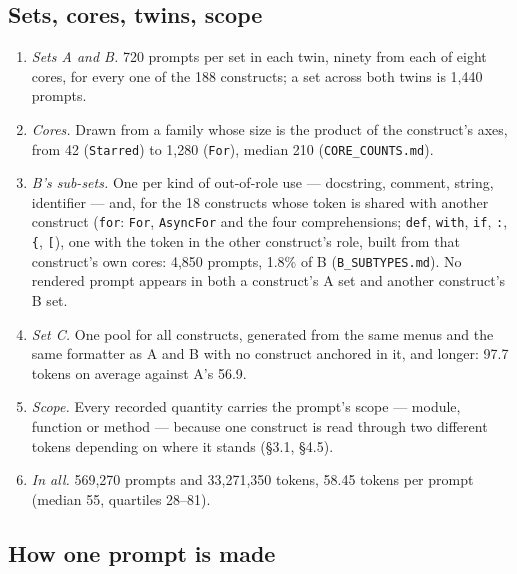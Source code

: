 \documentclass{article}
\begin{document}
\subsection{Sets, cores, twins, scope}
\begin{enumerate}[topsep=2pt,itemsep=1pt,parsep=0pt,partopsep=0pt,leftmargin=*]
\item \emph{Sets A and B.} 720 prompts per set in each twin, ninety from each of eight cores, for every one of the 188 constructs; a set across both twins is 1,440 prompts.
\item \emph{Cores.} Drawn from a family whose size is the product of the construct's axes, from 42 (\texttt{Starred}) to 1,280 (\texttt{For}), median 210 (\texttt{CORE\_COUNTS.md}).
\item \emph{B's sub-sets.} One per kind of out-of-role use --- docstring, comment, string, identifier --- and, for the 18 constructs whose token is shared with another construct (\texttt{for}: \texttt{For}, \texttt{AsyncFor} and the four comprehensions; \texttt{def}, \texttt{with}, \texttt{if}, \texttt{:}, \texttt{\{}, \texttt{[}), one with the token in the other construct's role, built from that construct's own cores: 4,850 prompts, 1.8\% of B (\texttt{B\_SUBTYPES.md}). No rendered prompt appears in both a construct's A set and another construct's B set.
\item \emph{Set C.} One pool for all constructs, generated from the same menus and the same formatter as A and B with no construct anchored in it, and longer: 97.7 tokens on average against A's 56.9.
\item \emph{Scope.} Every recorded quantity carries the prompt's scope --- module, function or method --- because one construct is read through two different tokens depending on where it stands (\S3.1, \S4.5).
\item \emph{In all.} 569,270 prompts and 33,271,350 tokens, 58.45 tokens per prompt (median 55, quartiles 28--81).
\end{enumerate}

\subsection{How one prompt is made}
\end{document}
